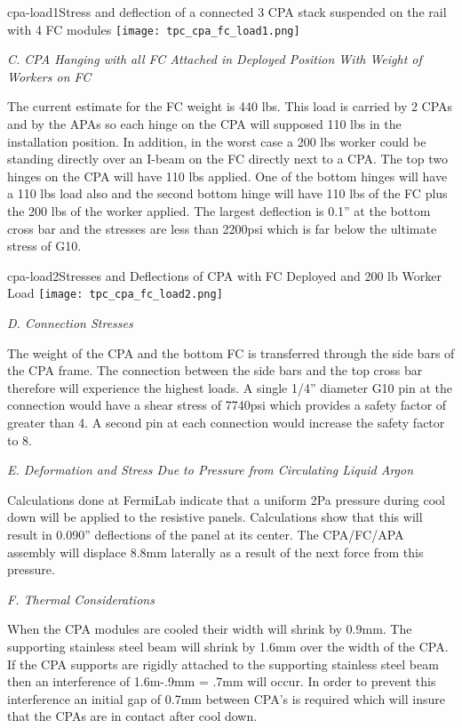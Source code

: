 \begin{cdrfigure}{cpa-load1}{Stress and deflection of a connected 3 CPA stack suspended on the rail with 4 FC modules} 
\texttt{[image: tpc\_cpa\_fc\_load1.png]}
\end{cdrfigure}


{\it  C. CPA Hanging with all FC Attached in Deployed Position With Weight of Workers on FC}

The current estimate for the FC weight is 440 lbs.  This load is carried by 2 CPAs and by the APAs so each hinge on the CPA will supposed 110 lbs in the installation position.  In addition, in the worst case a 200 lbs worker could be standing directly over an I-beam on the FC directly next to a CPA.  The top two hinges on the CPA will have 110 lbs applied.  One of the bottom hinges will have a 110 lbs load also and the second bottom hinge will have 110 lbs of the FC plus the 200 lbs of the worker applied.  The largest deflection is 0.1'' at the bottom cross bar and the stresses are less than 2200psi which is far below the ultimate stress of G10.

\begin{cdrfigure}{cpa-load2}{Stresses and Deflections of CPA with FC Deployed and 200 lb Worker Load} 
\texttt{[image: tpc\_cpa\_fc\_load2.png]}
\end{cdrfigure}

{\it D. Connection Stresses}

The weight of the CPA and the bottom FC is transferred through the side bars of the CPA frame.  The connection between the side bars and the top cross bar therefore will experience the highest loads.  A single 1/4'' diameter G10 pin at the connection would have a shear stress of 7740psi which provides a safety factor of greater than 4.  A second pin at each connection would increase the safety factor to 8.  

{\it E. Deformation and Stress Due to Pressure from Circulating Liquid Argon}

Calculations done at FermiLab indicate that a uniform 2Pa pressure during cool down will be applied to the resistive panels.  Calculations show that this will result in 0.090'' deflections of the panel at its center.  The CPA/FC/APA assembly will displace 8.8mm laterally as a result of the next force from this pressure.  

{\it F. Thermal Considerations}

When the CPA modules are cooled their width will shrink by 0.9mm.  The supporting stainless steel beam will shrink by 1.6mm over the width of the CPA.  If the CPA supports are rigidly attached to the supporting stainless steel beam then an interference of 1.6m-.9mm = .7mm will occur.  In order to prevent this interference an initial gap of 0.7mm between CPA’s is required which will insure that the CPAs are in contact after cool down.  

